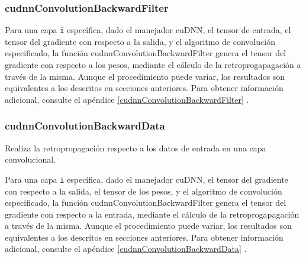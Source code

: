 \subsubsection{cudnnConvolutionBackwardFilter}

Para una capa \texttt{i} específica, dado el manejador cuDNN, el tensor de entrada, el tensor del gradiente con respecto a la salida, y el algoritmo de convolución especificado, la función cudnnConvolutionBackwardFilter genera el tensor del gradiente con respecto a los pesos, mediante el cálculo de la retroprogapagación a través de la misma. Aunque el procedimiento puede variar, los resultados son equivalentes a los descritos en secciones anteriores. Para obtener información adicional, consulte el apéndice \ref{cudnnConvolutionBackwardFilter} \cite{cuDNN_conv_back_w}.

\subsubsection{cudnnConvolutionBackwardData}
Realiza la retropropagación respecto a los datos de entrada en una capa convolucional.

Para una capa \texttt{i} específica, dado el manejador cuDNN, el tensor del gradiente con respecto a la salida, el tensor de los pesos, y el algoritmo de convolución especificado, la función cudnnConvolutionBackwardFilter genera el tensor del gradiente con respecto a la entrada, mediante el cálculo de la retroprogapagación a través de la misma. Aunque el procedimiento puede variar, los resultados son equivalentes a los descritos en secciones anteriores. Para obtener información adicional, consulte el apéndice \ref{cudnnConvolutionBackwardData} \cite{cuDNN_conv_back_x}.


